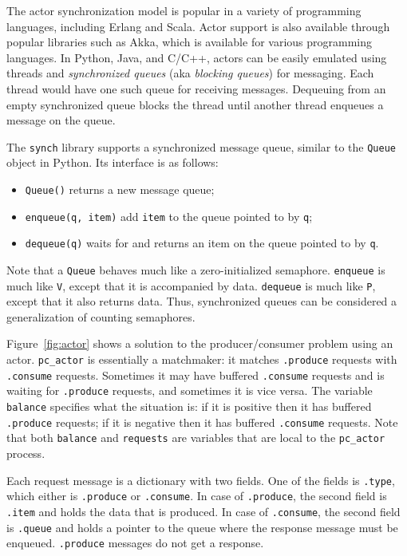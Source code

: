 \documentclass{report}
\begin{document}
The actor synchronization model is popular in a variety of programming
languages, including Erlang and Scala.  Actor support is also available
through popular libraries such as Akka, which is available for various
programming languages.  In Python, Java, and C/C++,
actors can be easily emulated using threads and \emph{synchronized queues}
(aka \emph{blocking queues}) for messaging.
Each thread would have one such queue for receiving messages.
Dequeuing from an empty synchronized queue blocks the thread until
another thread enqueues a message on the queue.

The \texttt{synch} library supports a synchronized message queue,
similar to the \texttt{Queue} object in Python.
Its interface is as follows:
\begin{itemize}
\item \texttt{Queue()} returns a new message queue;
\item \texttt{enqueue(q, item)} add \texttt{item} to the queue pointed to by \texttt{q};
\item \texttt{dequeue(q)} waits for and returns an item on the queue pointed to by \texttt{q}.
\end{itemize}

Note that a \texttt{Queue} behaves much like a zero-initialized semaphore.
\texttt{enqueue} is much like \texttt{V}, except that it is accompanied by data.
\texttt{dequeue} is much like \texttt{P}, except that it also returns data.
Thus, synchronized queues can be considered a generalization of counting semaphores.

Figure~\ref{fig:actor} shows a solution to the producer/consumer problem using
an actor.  \texttt{pc\_actor} is essentially a matchmaker: it matches
\texttt{.produce} requests with \texttt{.consume} requests.
Sometimes it may have buffered \texttt{.consume} requests and is waiting for
\texttt{.produce} requests, and sometimes it is vice versa.
The variable \texttt{balance} specifies what the situation is: if it is positive
then it has buffered \texttt{.produce} requests;
if it is negative
then it has buffered \texttt{.consume} requests.
Note that both \texttt{balance} and \texttt{requests} are variables that are
local to the \texttt{pc\_actor} process.

Each request message is a dictionary with two fields.  One of the fields is
\texttt{.type}, which either is \texttt{.produce} or \texttt{.consume}.
In case of \texttt{.produce}, the second field is \texttt{.item} and holds
the data that is produced.
In case of \texttt{.consume}, the second field is \texttt{.queue} and holds
a pointer to the queue where the response message must be enqueued.
\texttt{.produce} messages do not get a response.
\end{document}
